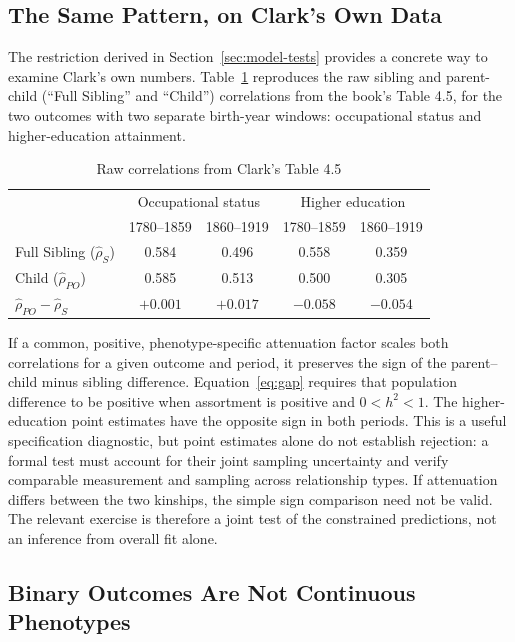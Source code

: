 \documentclass[12pt]{article}
\begin{document}
\subsection{The Same Pattern, on Clark's Own Data}

The restriction derived in Section~\ref{sec:model-tests} provides a concrete
way to examine Clark's own numbers. Table~\ref{tab:table45} reproduces
the raw sibling and parent-child (``Full Sibling'' and ``Child'') correlations
from the book's Table 4.5, for the two outcomes with two separate birth-year
windows: occupational status and higher-education attainment.

\begin{table}[h]
\centering
\caption{Raw correlations from Clark's Table 4.5}
\label{tab:table45}
\begin{tabular}{lcccc}
\hline
 & \multicolumn{2}{c}{Occupational status} & \multicolumn{2}{c}{Higher education} \\
 & 1780--1859 & 1860--1919 & 1780--1859 & 1860--1919 \\
\hline
Full Sibling ($\hat\rho_S$)      & 0.584 & 0.496 & 0.558 & 0.359 \\
Child ($\hat\rho_{PO}$)          & 0.585 & 0.513 & 0.500 & 0.305 \\
\hline
$\hat\rho_{PO}-\hat\rho_S$       & $+0.001$ & $+0.017$ & $-0.058$ & $-0.054$ \\
\hline
\end{tabular}
\end{table}

If a common, positive, phenotype-specific attenuation factor scales
both correlations for a given outcome and period, it preserves the sign
of the parent--child minus sibling difference. Equation~\eqref{eq:gap}
requires that population difference to be positive when assortment is
positive and $0<h^2<1$. The higher-education point estimates have the
opposite sign in both periods. This is a useful specification diagnostic,
but point estimates alone do not establish rejection: a formal test must
account for their joint sampling uncertainty and verify comparable
measurement and sampling across relationship types. If attenuation differs
between the two kinships, the simple sign comparison need not be valid.
The relevant exercise is therefore a joint test of the constrained
predictions, not an inference from overall fit alone.

\subsection{Binary Outcomes Are Not Continuous Phenotypes}
\label{sec:binary-outcomes}
\end{document}

